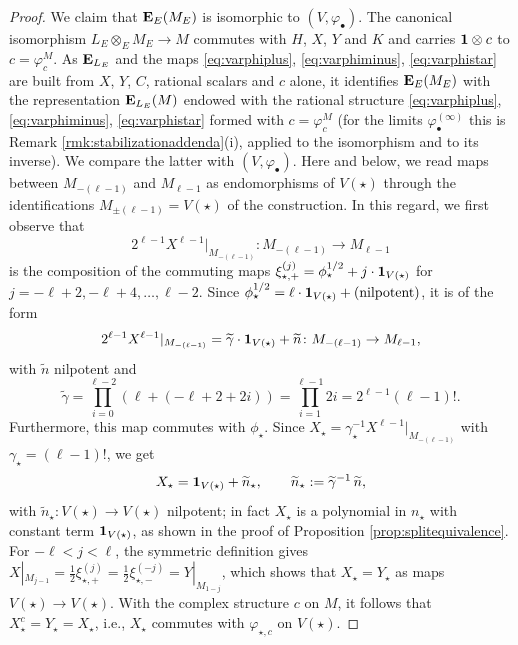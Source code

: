 \documentclass[a4paper,12pt,reqno]{amsart}
\newcommand{\EE}{{\rm\bf E}}
\theoremstyle{plain}
\theoremstyle{remark}
\begin{document}
\begin{proof}
    \smallskip
    We claim that $\EE_{E}(M_E)$ is isomorphic to $(V,\varphi_\bullet)$. The canonical isomorphism $L_E\otimes_E M_E\to M$ commutes with $H$, $X$, $Y$ and $K$ and carries ${\bf1}\otimes c$ to $c=\varphi_c^M$. As $\EE_{L_E}$ and the maps \eqref{eq:varphiplus}, \eqref{eq:varphiminus}, \eqref{eq:varphistar} are built from $X$, $Y$, $C$, rational scalars and $c$ alone, it identifies $\EE_E(M_E)$ with the representation $\EE_{L_E}(M)$ endowed with the rational structure \eqref{eq:varphiplus}, \eqref{eq:varphiminus}, \eqref{eq:varphistar} formed with $c=\varphi_c^M$ (for the limits $\varphi_\bullet^{(\infty)}$ this is Remark \ref{rmk:stabilizationaddenda}(i), applied to the isomorphism and to its inverse). We compare the latter with $(V,\varphi_\bullet)$. Here and below, we read maps between $M_{-(\ell-1)}$ and $M_{\ell-1}$ as endomorphisms of $V(\star)$ through the identifications $M_{\pm(\ell-1)}=V(\star)$ of the construction. In this regard, we first observe that
    \[
    2^{\ell-1}X^{\ell-1}|_{M_{-(\ell-1)}}\colon M_{-(\ell-1)}\to M_{\ell-1}
    \]
    is the composition of the commuting maps $\xi_{\star,+}^{(j)}=\phi_\star^{1/2}+j\cdot{\bf1}_{V(\star)}$ for $j=-\ell+2,-\ell+4,\dots,\ell-2$. Since $\phi_\star^{1/2}=\ell\cdot{\bf1}_{V(\star)}+(\text{nilpotent})$, it is of the form
    \[
    2^{\ell-1}X^{\ell-1}|_{M_{-(\ell-1)}}=\widetilde{\gamma}\cdot{\bf1}_{V(\star)}+\widetilde{n}\colon M_{-(\ell-1)}\to M_{\ell-1},
    \]
    with $\widetilde{n}$ nilpotent and
    \[
    \widetilde{\gamma}=\prod_{i=0}^{\ell-2}\left(\ell+(-\ell+2+2i)\right)=\prod_{i=1}^{\ell-1}2i=2^{\ell-1}(\ell-1)!.
    \]
    Furthermore, this map commutes with $\phi_\star$. Since $X_\star=\gamma_\star^{-1}X^{\ell-1}|_{M_{-(\ell-1)}}$ with $\gamma_\star=(\ell-1)!$, we get
    \[
    X_\star={\bf1}_{V(\star)}+\widetilde{n}_\star,\qquad \widetilde{n}_\star:=\widetilde{\gamma}^{-1}\,\widetilde{n},
    \]
    with $\widetilde{n}_\star\colon V(\star)\to V(\star)$ nilpotent; in fact $X_\star$ is a polynomial in $n_\star$ with constant term ${\bf1}_{V(\star)}$, as shown in the proof of Proposition \ref{prop:splitequivalence}.
    For $-\ell<j<\ell$, the symmetric definition gives $X|_{M_{j-1}}=\frac{1}{2}\xi_{\star,+}^{(j)}=\frac{1}{2}\xi_{\star,-}^{(-j)}=Y|_{M_{1-j}}$, which shows that $X_\star=Y_\star$ as maps $V(\star)\to V(\star)$. With the complex structure $c$ on $M$, it follows that $X_\star^c=Y_\star=X_\star$, i.e., $X_\star$ commutes with $\varphi_{\star,c}$ on $V(\star)$.


\end{proof}
\end{document}
